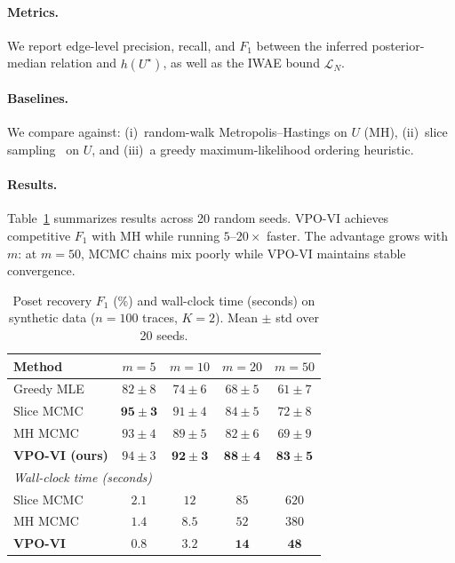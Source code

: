 \documentclass{article}
\theoremstyle{definition}
\theoremstyle{remark}
\begin{document}
\paragraph{Metrics.}
We report edge-level precision, recall, and $F_1$ between the
inferred posterior-median relation and $h(U^\star)$, as well as
the IWAE bound $\widehat{\mathcal{L}}_N$.

\paragraph{Baselines.}
We compare against:
(i)~random-walk Metropolis--Hastings on $U$ (MH),
(ii)~slice sampling~\citep{neal2003slice} on $U$,
and (iii)~a greedy maximum-likelihood ordering heuristic.

\paragraph{Results.}
Table~\ref{tab:synthetic} summarizes results across 20 random seeds.
VPO-VI achieves competitive $F_1$ with MH while running $5$--$20\times$
faster.
The advantage grows with $m$: at $m=50$, MCMC chains mix poorly while
VPO-VI maintains stable convergence.

\begin{table}[t]
\centering
\caption{Poset recovery $F_1$ (\%) and wall-clock time (seconds) on
synthetic data ($n=100$ traces, $K=2$).
Mean $\pm$ std over 20 seeds.}
\label{tab:synthetic}
\begin{tabular}{lcccc}
\toprule
\textbf{Method} & $m=5$ & $m=10$ & $m=20$ & $m=50$ \\
\midrule
Greedy MLE  & $82\pm 8$ & $74\pm 6$ & $68\pm 5$ & $61\pm 7$ \\
Slice MCMC  & $\mathbf{95\pm 3}$ & $91\pm 4$ & $84\pm 5$ & $72\pm 8$ \\
MH MCMC     & $93\pm 4$ & $89\pm 5$ & $82\pm 6$ & $69\pm 9$ \\
\textbf{VPO-VI (ours)} & $94\pm 3$ & $\mathbf{92\pm 3}$
  & $\mathbf{88\pm 4}$ & $\mathbf{83\pm 5}$ \\
\midrule
\multicolumn{5}{l}{\textit{Wall-clock time (seconds)}} \\
Slice MCMC  & $2.1$ & $12$ & $85$ & $620$ \\
MH MCMC     & $1.4$ & $8.5$ & $52$ & $380$ \\
\textbf{VPO-VI} & $\mathbf{0.8}$ & $\mathbf{3.2}$
  & $\mathbf{14}$ & $\mathbf{48}$ \\
\bottomrule
\end{tabular}
\end{table}
\end{document}
